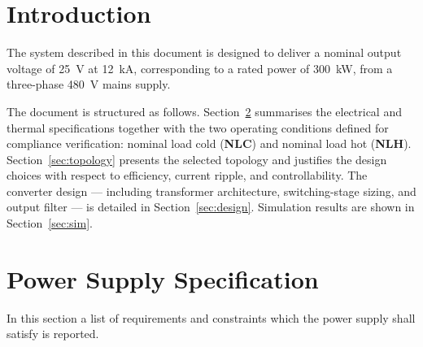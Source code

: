 \documentclass[12pt,a4paper]{scrartcl}
\begin{document}
\begin{onehalfspace}
\section{Introduction}

The system described in this document is designed to deliver a nominal output voltage of \SI{25}{\volt} at \SI{12}{\kilo\ampere},
corresponding to a rated power of \SI{300}{\kilo\watt}, from a three-phase \SI{480}{\volt} mains supply.

The document is structured as follows. Section~\ref{sec:specs} summarises the electrical
and thermal specifications together with the two operating conditions defined for
compliance verification: nominal load cold (\textbf{NLC}) and nominal load hot (\textbf{NLH}).
Section~\ref{sec:topology} presents the selected topology and justifies the design choices
with respect to efficiency, current ripple, and controllability.
The converter design — including transformer architecture, switching-stage sizing, and
output filter — is detailed in Section~\ref{sec:design}. Simulation results are shown in Section~\ref{sec:sim}.

\section{Power Supply Specification}\label{sec:specs}
In this section a list of requirements and constraints which the power supply shall satisfy is reported. 


\end{onehalfspace}
\end{document}
